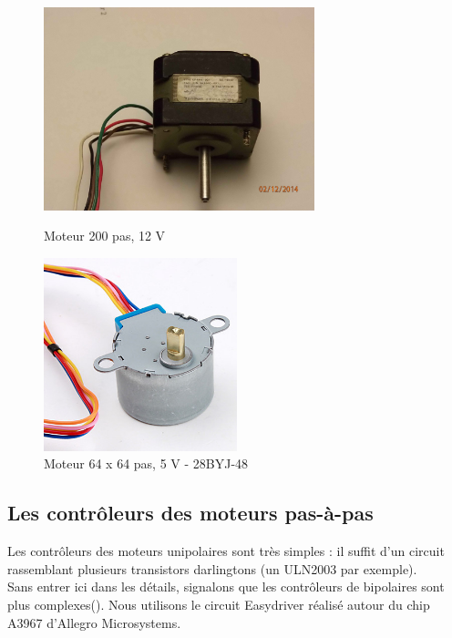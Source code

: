\documentclass[a4paper,10pt]{report}
\begin{document}
\begin{figure}[h!]
\begin{minipage}{.5\textwidth}
	\centering
	\includegraphics[width=0.7\textwidth]{Tandon.JPG}
	\caption{Moteur 200 pas, 12 V}
    \label{Tandon}
\end{minipage}%
\begin{minipage}{.5\textwidth}
	\centering
	\includegraphics[width=0.5\textwidth]{stepper5V.jpg}
	\caption{Moteur 64 x 64 pas, 5 V - 28BYJ-48}
    \label{28BYJ-48}
\end{minipage}
\end{figure}
\subsection{Les contrôleurs des moteurs pas-à-pas}
Les contrôleurs des moteurs unipolaires sont très simples : il suffit d'un circuit rassemblant plusieurs transistors darlingtons (un ULN2003 par exemple).\\
Sans entrer ici dans les détails, signalons que les contrôleurs de bipolaires sont plus complexes(\cite{stepctrl}). Nous utilisons le circuit Easydriver réalisé autour du chip A3967 d'Allegro Microsystems.
\end{document}
